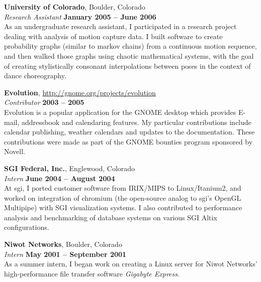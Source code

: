 \documentclass[margin,line]{resume}
\begin{document}
\begin{resume}
        {\bf University of Colorado}, Boulder, Colorado \vspace{2mm}\\\vspace{1mm}%
        {\sl Research Assistant} \hfill {\bf January 2005 -- June 2006}\\
        As an undergraduate research assistant, I participated in a research
        project dealing with analysis of motion capture data. I built software to
        create probability graphs (similar to markov chains) from a continuous
        motion sequence, and then walked those graphs using chaotic mathematical
        systems, with the goal of creating stylistically consonant interpolations
        between poses in the context of dance choreography.

        {\bf Evolution}, \href{http://gnome.org/projects/evolution}{http://gnome.org/projects/evolution} \vspace{2mm}\\\vspace{1mm}%
        {\sl Contributor} \hfill {\bf 2003 -- 2005}\\
        Evolution is a popular application for the GNOME desktop which provides
        E-mail, addressbook and calendaring features. My particular contributions
        include calendar publishing, weather calendars and updates to the
        documentation. These contributions were made as part of the GNOME bounties
        program sponsored by Novell.

        {\bf SGI Federal, Inc.}, Englewood, Colorado \vspace{2mm}\\\vspace{1mm}%
        {\sl Intern} \hfill {\bf June 2004 -- August 2004}\\
        At sgi, I ported customer software from IRIX/MIPS to Linux/Itanium2, and
        worked on integration of chromium (the open-source analog to sgi's OpenGL
        Multipipe) with SGI visualization systems. I also contributed to
        performance analysis and benchmarking of database systems on various SGI
        Altix configurations.

        {\bf Niwot Networks}, Boulder, Colorado \vspace{2mm}\\\vspace{1mm}%
        {\sl Intern} \hfill {\bf May 2001 -- September 2001}\\
        As a summer intern, I began work on creating a Linux server for Niwot
        Networks' high-performance file transfer software {\sl Gigabyte Express}.


\end{resume}
\end{document}
